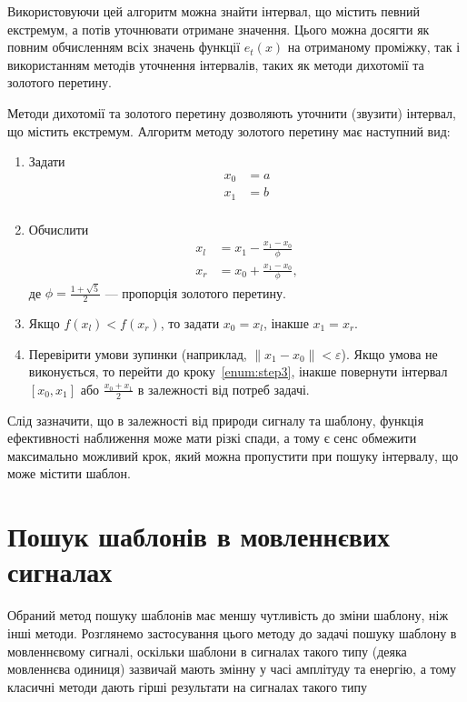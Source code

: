         Використовуючи цей алгоритм можна знайти інтервал, що містить певний екстремум, а потів уточнювати отримане
        значення.
        Цього можна досягти як повним обчисленням всіх значень функції $e_t(x)$ на отриманому проміжку, так і
        використанням методів уточнення інтервалів, таких як методи дихотомії та золотого перетину.

        Методи дихотомії та золотого перетину дозволяють уточнити (звузити) інтервал, що містить екстремум.
        Алгоритм методу золотого перетину має наступний вид:
        \begin{enumerate}
            \item Задати
                \begin{align*}
                    x_0 &= a\\
                    x_1 &= b\\
                \end{align*}
            \item Обчислити
                \begin{align*}
                    x_l &= x_1 - \frac{x_1 - x_0}{\phi}\\
                    x_r &= x_0 + \frac{x_1 - x_0}{\phi},
                \end{align*}
                де $\phi = \frac{1 + \sqrt{ 5 }}{2}$ --- пропорція золотого перетину.
            \item\label{enum:step3} Якщо $f(x_l) < f(x_r)$, то задати $x_0 = x_l$, інакше $x_1 = x_r$.
            \item Перевірити умови зупинки (наприклад, $\|x_1 - x_0\| < \varepsilon$).
                Якщо умова не виконується, то перейти до кроку~\ref{enum:step3}, інакше повернути інтервал ${[x_0,
                    x_1]}$ або $\frac{x_0+x_1}{2}$ в залежності від потреб задачі.
        \end{enumerate}

        Слід зазначити, що в залежності від природи сигналу та шаблону, функція ефективності наближення може мати
        різкі спади, а тому є сенс обмежити максимально можливий крок, який можна пропустити при пошуку інтервалу, що
        може містити шаблон.
\section{Пошук шаблонів в мовленнєвих сигналах}
    Обраний метод пошуку шаблонів має меншу чутливість до зміни шаблону, ніж інші методи.
    Розглянемо застосування цього методу до задачі пошуку шаблону в мовленнєвому сигналі, оскільки шаблони в сигналах
    такого типу (деяка мовленнєва одиниця) зазвичай мають змінну у часі амплітуду та енергію, а тому класичні методи
    дають гірші результати на сигналах такого типу

